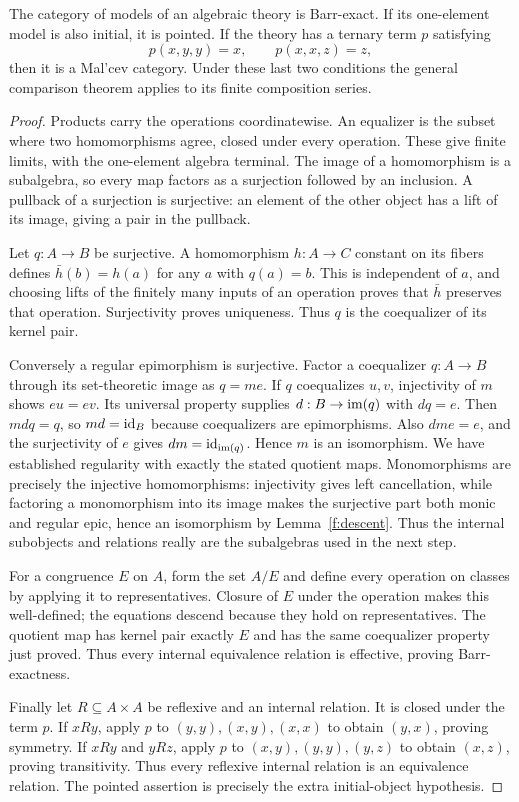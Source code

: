 \begin{proposition}\label{e:algebraic-instances}
The category of models of an algebraic theory is Barr-exact. If its one-element
model is also initial, it is pointed. If the theory has a ternary term $p$
satisfying
\[
p(x,y,y)=x,\qquad p(x,x,z)=z,
\]
then it is a Mal'cev category. Under these last two conditions the general
comparison theorem applies to its finite composition series.
\end{proposition}
\begin{proof}
Products carry the operations coordinatewise. An equalizer is the subset
where two homomorphisms agree, closed under every operation. These give finite
limits, with the one-element algebra terminal. The image of a homomorphism
is a subalgebra, so every map factors as a surjection followed by an inclusion.
A pullback of a surjection is surjective: an element of the other object has
a lift of its image, giving a pair in the pullback.

Let $q:A\to B$ be surjective. A homomorphism $h:A\to C$ constant on its
fibers defines $\bar h(b)=h(a)$ for any $a$ with $q(a)=b$. This is independent
of $a$, and choosing lifts of the finitely many inputs of an operation proves
that $\bar h$ preserves that operation. Surjectivity proves uniqueness.
Thus $q$ is the coequalizer of its kernel pair.

Conversely a regular epimorphism is surjective. Factor a coequalizer
$q:A\to B$ through its set-theoretic image as $q=me$. If $q$ coequalizes
$u,v$, injectivity of $m$ shows $eu=ev$. Its universal property supplies
$d:B\to\operatorname{im}(q)$ with $dq=e$. Then $mdq=q$, so $md=\mathrm{id}_B$ because
coequalizers are epimorphisms. Also $dme=e$, and the surjectivity of $e$
gives $dm=\mathrm{id}_{\operatorname{im}(q)}$. Hence $m$ is an isomorphism.
We have established regularity with exactly the stated quotient maps.
Monomorphisms are precisely the injective homomorphisms: injectivity gives
left cancellation, while factoring a monomorphism into its image makes
the surjective part both monic and regular epic, hence an isomorphism by
Lemma~\ref{f:descent}. Thus the internal subobjects and relations really
are the subalgebras used in the next step.

For a congruence $E$ on $A$, form the set $A/E$ and define every operation
on classes by applying it to representatives. Closure of $E$ under the
operation makes this well-defined; the equations descend because they hold
on representatives. The quotient map has kernel pair exactly $E$ and has
the same coequalizer property just proved. Thus every internal equivalence
relation is effective, proving Barr-exactness.

Finally let $R\subseteq A\times A$ be reflexive and an internal relation.
It is closed under the term $p$. If $xRy$, apply $p$ to
$(y,y),(x,y),(x,x)$ to obtain $(y,x)$, proving symmetry. If $xRy$ and $yRz$,
apply $p$ to $(x,y),(y,y),(y,z)$ to obtain $(x,z)$, proving transitivity.
Thus every reflexive internal relation is an equivalence relation.
The pointed assertion is precisely the extra initial-object hypothesis.
\end{proof}

